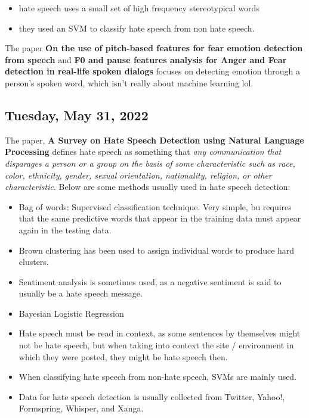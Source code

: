 \documentclass[11pt,letterpaper]{article}
\begin{document}
\begin{itemize}
    \item hate speech uses a small set of high frequency stereotypical words
    \item they used an SVM to classify hate speech from non hate speech.
\end{itemize}

The paper \textbf{On the use of pitch-based features for fear emotion detection from speech} and \textbf{F0 and pause features analysis for Anger and Fear detection in real-life spoken dialogs} focuses on detecting emotion through a person's spoken word, which isn't really about machine learning lol.

\subsection{Tuesday, May 31, 2022}
The paper, \textbf{A Survey on Hate Speech Detection using Natural Language Processing} defines hate speech as something that \emph{ any communication that disparages a person or a group on the basis of some characteristic such as race, color, ethnicity, gender, sexual orientation, nationality, religion, or other characteristic}. Below are some methods usually used in hate speech detection:
\begin{itemize}
    \item Bag of words: Supervised classification technique. Very simple, bu requires that the same predictive words that appear in the training data must appear again in the testing data.
    \item Brown clustering has been used to assign individual words to produce hard clusters. 
    \item Sentiment analysis is sometimes used, as a negative sentiment is said to usually be a hate speech message.
    \item Bayesian Logistic Regression
    \item Hate speech must be read in context, as some sentences by themselves might not be hate speech, but when taking into context the site / environment in which they were posted, they might be hate speech then.
    \item When classifying hate speech from non-hate speech, SVMs are mainly used.
    \item Data for hate speech detection is usually collected from Twitter, Yahoo!, Formspring, Whisper, and Xanga.
\end{itemize}
\end{document}
